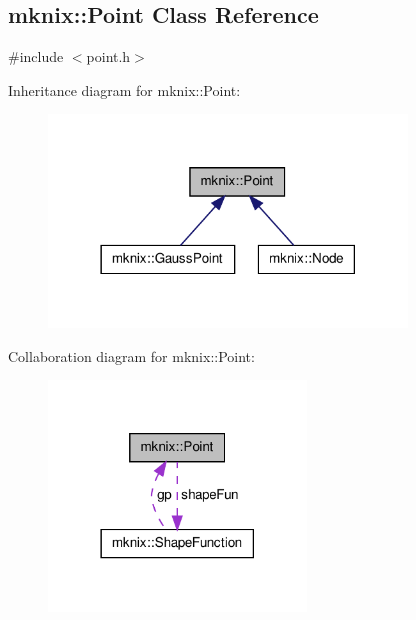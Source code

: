 \hypertarget{classmknix_1_1_point}{\subsection{mknix\-:\-:Point Class Reference}
\label{classmknix_1_1_point}
}


{\ttfamily \#include $<$point.\-h$>$}



Inheritance diagram for mknix\-:\-:Point\-:\nopagebreak
\begin{figure}[H]
\begin{center}
\leavevmode
\includegraphics[width=270pt]{d1/d48/classmknix_1_1_point__inherit__graph}
\end{center}
\end{figure}


Collaboration diagram for mknix\-:\-:Point\-:\nopagebreak
\begin{figure}[H]
\begin{center}
\leavevmode
\includegraphics[width=194pt]{d6/d9a/classmknix_1_1_point__coll__graph}
\end{center}
\end{figure}
